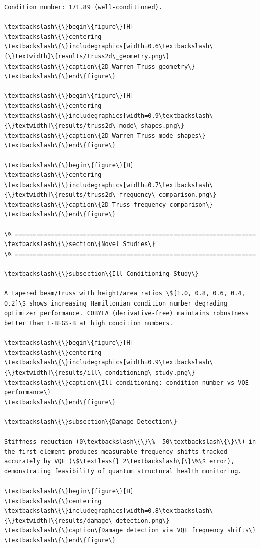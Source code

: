 \documentclass[12pt, a4paper]{article}
\begin{document}
\begin{lstlisting}[style=codestyle, caption={VQA\_Modal\_Analysis\_Report.tex}]
Condition number: 171.89 (well-conditioned).

\textbackslash\{\}begin\{figure\}[H]
\textbackslash\{\}centering
\textbackslash\{\}includegraphics[width=0.6\textbackslash\{\}textwidth]\{results/truss2d\_geometry.png\}
\textbackslash\{\}caption\{2D Warren Truss geometry\}
\textbackslash\{\}end\{figure\}

\textbackslash\{\}begin\{figure\}[H]
\textbackslash\{\}centering
\textbackslash\{\}includegraphics[width=0.9\textbackslash\{\}textwidth]\{results/truss2d\_mode\_shapes.png\}
\textbackslash\{\}caption\{2D Warren Truss mode shapes\}
\textbackslash\{\}end\{figure\}

\textbackslash\{\}begin\{figure\}[H]
\textbackslash\{\}centering
\textbackslash\{\}includegraphics[width=0.7\textbackslash\{\}textwidth]\{results/truss2d\_frequency\_comparison.png\}
\textbackslash\{\}caption\{2D Truss frequency comparison\}
\textbackslash\{\}end\{figure\}

\% ===================================================================
\textbackslash\{\}section\{Novel Studies\}
\% ===================================================================

\textbackslash\{\}subsection\{Ill-Conditioning Study\}

A tapered beam/truss with height/area ratios \$[1.0, 0.8, 0.6, 0.4, 0.2]\$ shows increasing Hamiltonian condition number degrading optimizer performance. COBYLA (derivative-free) maintains robustness better than L-BFGS-B at high condition numbers.

\textbackslash\{\}begin\{figure\}[H]
\textbackslash\{\}centering
\textbackslash\{\}includegraphics[width=0.9\textbackslash\{\}textwidth]\{results/ill\_conditioning\_study.png\}
\textbackslash\{\}caption\{Ill-conditioning: condition number vs VQE performance\}
\textbackslash\{\}end\{figure\}

\textbackslash\{\}subsection\{Damage Detection\}

Stiffness reduction (0\textbackslash\{\}\%--50\textbackslash\{\}\%) in the first element produces measurable frequency shifts tracked accurately by VQE (\$\textless{} 2\textbackslash\{\}\%\$ error), demonstrating feasibility of quantum structural health monitoring.

\textbackslash\{\}begin\{figure\}[H]
\textbackslash\{\}centering
\textbackslash\{\}includegraphics[width=0.8\textbackslash\{\}textwidth]\{results/damage\_detection.png\}
\textbackslash\{\}caption\{Damage detection via VQE frequency shifts\}
\textbackslash\{\}end\{figure\}


\end{lstlisting}
\end{document}
